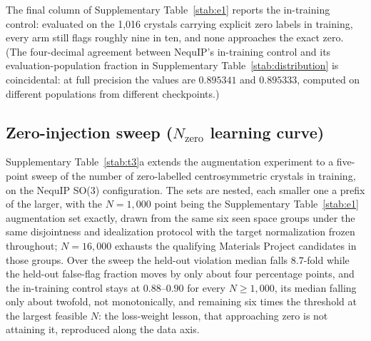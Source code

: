 The final column of Supplementary Table~\ref{stab:e1} reports the in-training control: evaluated on the 1,016 crystals carrying explicit zero labels in training, every arm still flags roughly nine in ten, and none approaches the exact zero. (The four-decimal agreement between NequIP's in-training control and its evaluation-population fraction in Supplementary Table~\ref{stab:distribution} is coincidental: at full precision the values are $0.895341$ and $0.895333$, computed on different populations from different checkpoints.)

\subsection*{Zero-injection sweep ($N_{\mathrm{zero}}$ learning curve)}

Supplementary Table~\ref{stab:t3}a extends the augmentation experiment to a five-point sweep of the number of zero-labelled centrosymmetric crystals in training, on the NequIP SO(3) configuration. The sets are nested, each smaller one a prefix of the larger, with the $N{=}1{,}000$ point being the Supplementary Table~\ref{stab:e1} augmentation set exactly, drawn from the same six seen space groups under the same disjointness and idealization protocol with the target normalization frozen throughout; $N{=}16{,}000$ exhausts the qualifying Materials Project candidates in those groups. Over the sweep the held-out violation median falls 8.7-fold while the held-out false-flag fraction moves by only about four percentage points, and the in-training control stays at $0.88$--$0.90$ for every $N \geq 1{,}000$, its median falling only about twofold, not monotonically, and remaining six times the threshold at the largest feasible $N$: the loss-weight lesson, that approaching zero is not attaining it, reproduced along the data axis.

